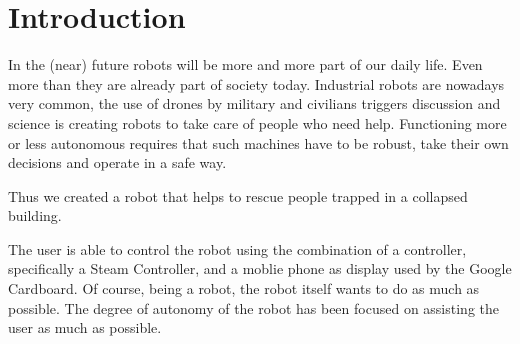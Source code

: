 \section{Introduction}
In the (near) future robots will be more and more part of our daily life. Even more than they are already part of society today. Industrial robots are nowadays very common, the use of drones by military and civilians triggers discussion and science is creating robots to take care of people who need help. Functioning more or less autonomous requires that such machines have to be robust, take their own decisions and operate in a safe way. 

Thus we created a robot that helps to rescue people trapped in a collapsed building.

The user is able to control the robot using the combination of a controller, specifically a Steam Controller, and a moblie phone as display used by the Google Cardboard. Of course, being a robot, the robot itself wants to do as much as possible. The degree of autonomy of the robot has been focused on assisting the user as much as possible.
